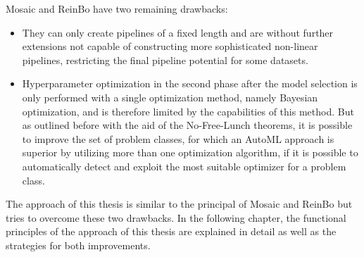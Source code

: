 Mosaic and ReinBo have two remaining drawbacks:
\begin{itemize}
    \item They can only create pipelines of a fixed length and are without further extensions not capable of constructing more sophisticated non-linear pipelines, restricting the final pipeline potential for some datasets.
    \item Hyperparameter optimization in the second phase after the model selection is only performed with a single optimization method, namely Bayesian optimization, and is therefore limited by the capabilities of this method.
    But as outlined before with the aid of the No-Free-Lunch theorems, it is possible to improve the set of problem classes, for which an AutoML approach is superior by utilizing more than one optimization algorithm, if it is possible to automatically detect and exploit the most suitable optimizer for a problem class.
\end{itemize}
The approach of this thesis is similar to the principal of Mosaic and ReinBo but tries to overcome these two drawbacks.
In the following chapter, the functional principles of the approach of this thesis are explained in detail as well as the strategies for both improvements.
